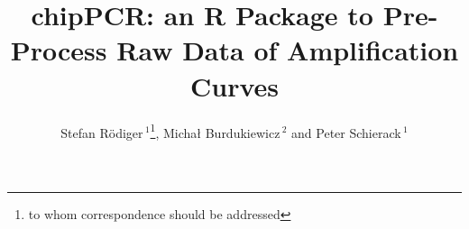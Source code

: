\documentclass{bioinfo}
\begin{document}

\title[chipPCR]{chipPCR: an R Package to Pre-Process Raw Data of Amplification Curves}
\author[R\"odiger \textit{et~al.}]{Stefan R\"odiger\,$^{1}$\footnote{to whom correspondence should be addressed}, Micha\l{} Burdukiewicz\,$^{2}$ and Peter Schierack\,$^1$}
\address{$^{1}$Faculty of Natural Sciences, Brandenburg University of Technology 
Cottbus--Senftenberg, Senftenberg, Germany\\
$^{2}$Department of Genomics, Faculty of Biotechnology, University of 
Wroc\l{}aw, Wroc\l{}aw, Poland}



\maketitle
\end{document}

